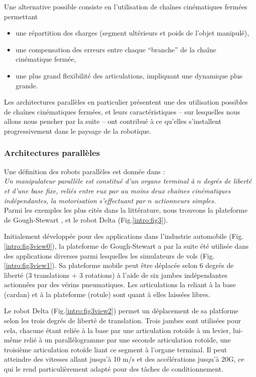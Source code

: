 Une alternative possible consiste en l'utilisation de chaînes cinématiques fermées permettant
\begin{itemize}
 \item une répartition des charges (segment ultérieurs et poids de l'objet manipulé),
 \item une compensation des erreurs entre chaque ``branche'' de la chaîne cinéma\-tique fermée,
 \item une plus grand flexibilité des articulations, impliquant une dynamique plus grande.
\end{itemize}

Les architectures parallèles en particulier présentent une des utilisation possibles de chaînes cinématiques fermées, et leurs caractéristiques -- sur lesquel\-les nous allons nous pencher par la suite -- ont contribué à ce qu'elles s'installent progressivement dans le paysage de la robotique.


\subsubsection{Architectures parallèles}

Une définition des robots parallèles est donnée dans \cite{merlet1997robots} :\\
{\it Un manipulateur parallèle est constitué d’un organe terminal à $n$ degrés de li\-berté et d’une base fixe, reliés entre eux par au moins deux chaînes
cinématiques indépendantes, la motorisation s’effectuant par $n$ actionneurs simples.}\\

Parmi les exemples les plus cités dans la littérature, nous trouvons la plateforme de Gough-Stewart \cite{1956:Gough}, \cite{1965:Stewart} et le robot Delta \cite{1988:Clavel} (Fig.\ref{intro:fig3}).

Initialement développée pour des applications dans l'industrie automobile (Fig.\ref{intro:fig3view0}), la plateforme de Gough-Stewart a par la suite été utilisée dans des applications diverses parmi lesquelles les simulateurs de vols (Fig.\ref{intro:fig3view1}). Sa plateforme mobile peut être déplacée selon 6 degrés de liberté (3 translations $+$ 3 rotations) à l'aide de six jambes indépendantes actionnées par des vérins pneumatiques. Les articulations la reliant à la base (cardan) et à la plateforme (rotule) sont quant à elles laissées libres.

Le robot Delta (Fig.\ref{intro:fig3view2}) permet un déplacement de sa platforme selon les trois degrés de liberté de translation. Trois jambes sont utilisées pour cela, chacune étant reliée à la base par une articulation rotoïde à un levier, lui-même relié à un parallélogramme par une seconde articulation rotoïde, une troisième articulation rotoïde liant ce segment à l'organe terminal. Il peut atteindre des vitesses allant jusqu'à 10 m/s et des accélérations jusqu'à 20G, ce qui le rend particulièrement adapté pour des tâches de conditionnement. 

